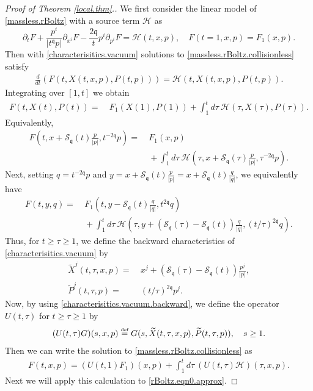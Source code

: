 \documentclass[reqno]{amsart}
\newcommand{\eqdef }{\overset{\mbox{\tiny{def}}}{=}}
\newcommand{\pv}{p}
\newcommand{\qv}{q}
\newcommand{\qq}{\mathfrak{q}}
\newcommand{\tq}{t^{\qq}}
\newcommand{\tqq}{t^{2\qq}}
\newcommand{\tiq}{\mathcal{S}_{\qq}}
\newcommand{\sourceS}{\mathcal{H}}
\theoremstyle{definition}
\numberwithin{equation}{section}
\numberwithin{theorem}{section}
\begin{document}
\begin{proof}[Proof of Theorem \ref{local.thm}.]
We first consider the linear model of \eqref{massless.rBoltz} with a source term ${\sourceS}$ as
\begin{equation}\label{massless.rBoltz.collisionless}
    \partial_t F+ \frac{\pv^i}{|\tq \pv|}\partial_{x^i} F
    -\frac{2\qq }{t} p^i \partial_{p^i} F = {\sourceS}(t,x,\pv), \quad 
F(t=1, x, p) = F_1(x,p).
\end{equation}
Then with \eqref{characterisitics.vacuum} solutions to \eqref{massless.rBoltz.collisionless} satisfy
\begin{align*}
    \frac{d}{dt } \left(F(t,{X}(t,x,\pv),{P}(t,\pv)) \right)
    = {\sourceS}(t,{X}(t,x,\pv),{P}(t,\pv)).
\end{align*}
Integrating over $[1,t]$ we obtain
 \begin{align*}
     F(t,{X}(t),{P}(t)) 
     = &~ 
     F_1({X}(1),{P}(1)) + \int_1^t d\tau~ {\sourceS}(\tau,{X}(\tau),{P}(\tau)).
 \end{align*}
 Equivalently,
\begin{align*}
    F\left(t,x+\tiq(t)\frac{\pv}{ |\pv|},{t^{-2\qq }} \pv \right) 
    = &~ 
    F_1(x,p)
    \\
    &~ 
    + \int_1^t d\tau~ {\sourceS}
    \left(\tau,x+\tiq(\tau)\frac{\pv}{ |\pv|},{\tau^{-2\qq }} \pv \right). 
\end{align*}
Next, setting $\qv = {t^{-2\qq }} \pv$ and $y=x+\tiq(t)\frac{\pv}{ |\pv|}=x+\tiq(t)\frac{\qv}{ |\qv|}$, we equivalently have
\begin{align*}
    F\left(t,y,\qv\right) 
    = &~ 
    F_1\left(t,y-\tiq(t)\frac{\qv}{ |\qv|}, \tqq\qv \right)
    \\
    &~ 
    + \int_1^t d\tau~ {\sourceS}
    \left(\tau,y+\left(\tiq(\tau)-\tiq(t) \right)\frac{\qv}{ |\qv|},{(t/\tau)^{2\qq }} \qv \right). 
\end{align*}
Thus, for $t \geq \tau \geq 1$, we define the backward characteristics of \eqref{characterisitics.vacuum} by 
\begin{equation} \label{characterisitics.vacuum.backward}
\begin{split}
\widetilde{X}^j(t,\tau,x,\pv)
= &~ 
x^j+\left(\tiq(\tau)-\tiq(t) \right)\frac{\pv^j}{ |\pv|},
\\
\widetilde{P}^j(t,\tau,\pv)
= &~ 
{(t/\tau)^{2\qq }}\pv^j.
\end{split}
\end{equation}
Now, by using \eqref{characterisitics.vacuum.backward}, we define the operator $U(t,\tau)$ for $t \geq \tau \geq 1$ by 
\begin{equation*}
    (U(t,\tau)G)(s,x,\pv) \eqdef G(s,\widetilde{X}(t,\tau,x,\pv),\widetilde{P}(t,\tau,\pv)), \quad s \ge 1.
\end{equation*}
Then we can write the solution to \eqref{massless.rBoltz.collisionless} as
\begin{align*}
    F(t,x,\pv) 
    =  
    (U(t,1)F_1)(x,\pv) 
    + 
    \int_1^t d\tau~ 
    (U(t,\tau){\sourceS})(\tau,x,\pv).
\end{align*}
Next we will apply this calculation to \eqref{rBoltz.eqn0.approx}.



\end{proof}
\end{document}
